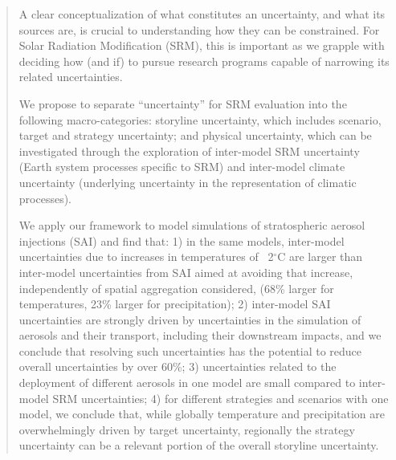 \documentclass[draft]{agujournal2019}
\begin{document}
\begin{abstract}
A clear conceptualization of what constitutes an uncertainty, and what its sources are, is crucial to understanding how they can be constrained. For Solar Radiation Modification (SRM), this is important as we grapple with deciding how (and if) to pursue research programs capable of narrowing its related uncertainties. 

We propose to separate “uncertainty” for SRM evaluation into the following macro-categories: storyline uncertainty, which includes scenario, target and strategy uncertainty; and physical uncertainty, which can be investigated through the exploration of inter-model SRM uncertainty (Earth system processes specific to SRM) and inter-model climate uncertainty (underlying uncertainty in the representation of climatic processes). 

We apply our framework to model simulations of stratospheric aerosol injections (SAI) and find that: 1) in the same models, inter-model uncertainties due to increases in temperatures of ~2$^{\circ}$C are larger than inter-model uncertainties from SAI aimed at avoiding that increase, independently of spatial aggregation considered, (68\% larger for temperatures, 23\% larger for precipitation); 2) inter-model SAI uncertainties are strongly driven by uncertainties in the simulation of aerosols and their transport, including their downstream impacts, and we conclude that resolving such uncertainties has the potential to reduce overall uncertainties by over 60\%; 3) uncertainties related to the deployment of different aerosols in one model are small compared to inter-model SRM uncertainties; 4) for different strategies and scenarios with one model, we conclude that, while globally temperature and precipitation are overwhelmingly driven by target uncertainty, regionally the strategy uncertainty can be a relevant portion of the overall storyline uncertainty.
\end{abstract}
\end{document}
